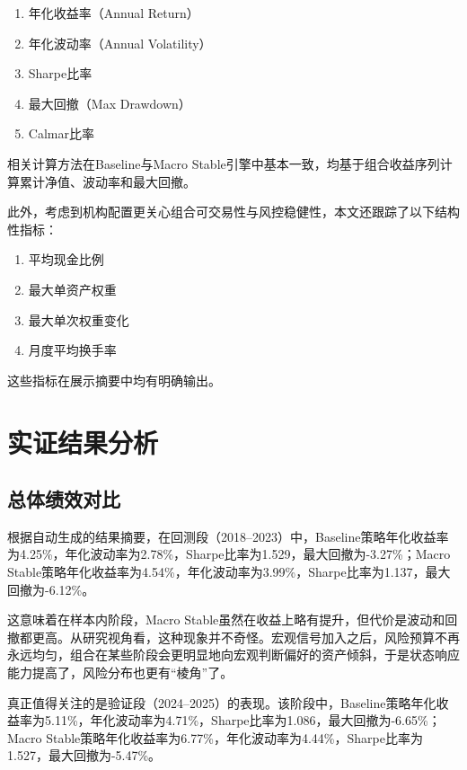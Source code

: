 \documentclass[12pt,a4paper]{ctexart}
\begin{document}
\begin{enumerate}[label=\arabic*)]
    \item 年化收益率（Annual Return）
    \item 年化波动率（Annual Volatility）
    \item Sharpe比率
    \item 最大回撤（Max Drawdown）
    \item Calmar比率
\end{enumerate}

相关计算方法在Baseline与Macro Stable引擎中基本一致，均基于组合收益序列计算累计净值、波动率和最大回撤。

此外，考虑到机构配置更关心组合可交易性与风控稳健性，本文还跟踪了以下结构性指标：

\begin{enumerate}[label=\arabic*)]
    \item 平均现金比例
    \item 最大单资产权重
    \item 最大单次权重变化
    \item 月度平均换手率
\end{enumerate}

这些指标在展示摘要中均有明确输出。

\section{实证结果分析}

\subsection{总体绩效对比}

根据自动生成的结果摘要，在回测段（2018--2023）中，Baseline策略年化收益率为4.25\%，年化波动率为2.78\%，Sharpe比率为1.529，最大回撤为-3.27\%；Macro Stable策略年化收益率为4.54\%，年化波动率为3.99\%，Sharpe比率为1.137，最大回撤为-6.12\%。

这意味着在样本内阶段，Macro Stable虽然在收益上略有提升，但代价是波动和回撤都更高。从研究视角看，这种现象并不奇怪。宏观信号加入之后，风险预算不再永远均匀，组合在某些阶段会更明显地向宏观判断偏好的资产倾斜，于是状态响应能力提高了，风险分布也更有“棱角”了。

真正值得关注的是验证段（2024--2025）的表现。该阶段中，Baseline策略年化收益率为5.11\%，年化波动率为4.71\%，Sharpe比率为1.086，最大回撤为-6.65\%；Macro Stable策略年化收益率为6.77\%，年化波动率为4.44\%，Sharpe比率为1.527，最大回撤为-5.47\%。
\end{document}
